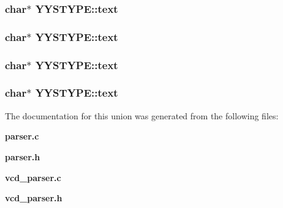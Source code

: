 \subsubsection{\setlength{\rightskip}{0pt plus 5cm}char$\ast$ YYSTYPE::text}\label{unionYYSTYPE_m17}


\subsubsection{\setlength{\rightskip}{0pt plus 5cm}char$\ast$ YYSTYPE::text}\label{unionYYSTYPE_m14}


\subsubsection{\setlength{\rightskip}{0pt plus 5cm}char$\ast$ YYSTYPE::text}\label{unionYYSTYPE_m8}


\subsubsection{\setlength{\rightskip}{0pt plus 5cm}char$\ast$ YYSTYPE::text}\label{unionYYSTYPE_m0}




The documentation for this union was generated from the following files:\begin{CompactItemize}
\item 
{\bf parser.c}\item 
{\bf parser.h}\item 
{\bf vcd\_\-parser.c}\item 
{\bf vcd\_\-parser.h}\end{CompactItemize}
